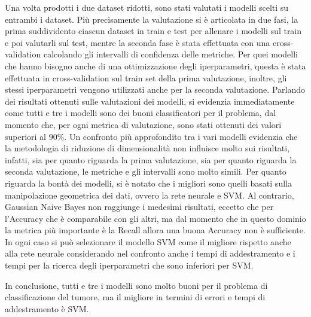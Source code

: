 Una volta prodotti i due dataset ridotti, sono stati valutati i modelli scelti su 
entrambi i dataset. Più precisamente la valutazione si è articolata in due fasi,
la prima suddividento ciascun dataset in train e test per allenare i modelli sul
train e poi valutarli sul test, mentre la seconda fase è stata effettuata con una
cross-validation calcolando gli intervalli di confidenza delle metriche. Per 
quei modelli che hanno bisogno anche di una ottimizzazione degli iperparametri,
questa è stata effettuata in cross-validation sul train set della prima valutazione,
inoltre, gli stessi iperparametri vengono utilizzati anche per la seconda valutazione.
Parlando dei risultati ottenuti sulle valutazioni dei modelli, si evidenzia immediatamente
come tutti e tre i modelli sono dei buoni classificatori per il problema, dal momento 
che, per ogni metrica di valutazione, sono stati ottenuti dei valori superiori al 
$90\%$.
Un confronto più approfondito tra i vari modelli evidenzia che la metodologia di riduzione di dimensionalità 
non influisce molto sui risultati, infatti, sia per quanto riguarda la prima valutazione,
sia per quanto riguarda la seconda valutazione, le metriche e gli intervalli sono 
molto simili. Per quanto riguarda la bontà dei modelli, si è notato che i migliori
sono quelli basati sulla manipolazione geometrica dei dati, ovvero la rete neurale 
e SVM. Al contrario, Gaussian Naive Bayes non raggiunge i medesimi risultati, eccetto
che per l'Accuracy che è comparabile con gli altri, ma dal momento che in questo
dominio la metrica più importante è la Recall allora una buona Accuracy non è 
sufficiente. In ogni caso si può selezionare il modello SVM come il migliore 
rispetto anche alla rete neurale considerando nel confronto anche i tempi di addestramento
e i tempi per la ricerca degli iperparametri che sono inferiori per SVM.

In conclusione, tutti e tre i modelli sono molto buoni per il problema di classificazione
del tumore, ma il migliore in termini di errori e tempi di addestramento è SVM.